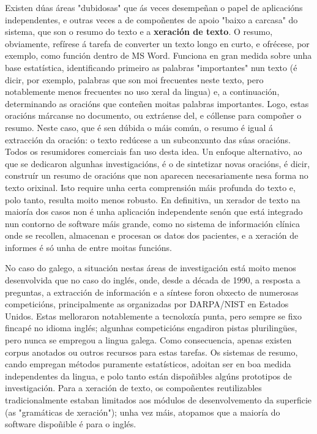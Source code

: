 \begin{multicols}{2}

Existen dúas áreas "dubidosas" que ás veces desempeñan o papel de aplicacións independentes, e outras veces a de compoñentes de apoio "baixo a carcasa" do sistema, que son o resumo do texto e a \textbf{xeración de texto}. O resumo, obviamente, refírese á tarefa de converter un texto longo en curto, e ofrécese, por exemplo, como función dentro de MS Word. Funciona en gran medida sobre unha base estatística, identificando primeiro as palabras "importantes" nun texto (é dicir, por exemplo, palabras que son moi frecuentes neste texto, pero notablemente menos frecuentes no uso xeral da lingua) e, a continuación, determinando as oracións que conteñen moitas palabras importantes. Logo, estas oracións márcanse no documento, ou extráense del, e cóllense para compoñer o resumo. Neste caso, que é sen dúbida o máis común, o resumo é igual á extracción da oración: o texto redúcese a un subconxunto das súas oracións. Todos os resumidores comerciais fan uso desta idea. Un enfoque alternativo, ao que se dedicaron algunhas investigacións, é o de sintetizar novas oracións, é dicir, construír un resumo de oracións que non aparecen necesariamente nesa forma no texto orixinal. Isto require unha certa comprensión máis profunda do texto e, polo tanto, resulta moito menos robusto. En definitiva, un xerador de texto na maioría dos casos non é unha aplicación independente senón que está integrado nun contorno de software máis grande, como no sistema de información clínica onde se recollen, almacenan e procesan os datos dos pacientes, e a xeración de informes é só unha de entre moitas funcións.


No caso do galego, a situación nestas áreas de investigación está moito menos desenvolvida que no caso do inglés, onde, desde a década de 1990, a resposta a preguntas, a extracción de información e a síntese foron obxecto de numerosas competicións, principalmente as organizadas por DARPA/NIST en Estados Unidos. Estas melloraron notablemente a tecnoloxía punta, pero sempre se fixo fincapé no idioma inglés; algunhas competicións engadiron pistas plurilingües, pero nunca se empregou a lingua galega. Como consecuencia, apenas existen corpus anotados ou outros recursos para estas tarefas. Os sistemas de resumo, cando empregan métodos puramente estatísticos, adoitan ser en boa medida independentes da lingua, e polo tanto están dispoñibles algúns prototipos de investigación. Para a xeración de texto, os compoñentes reutilizables tradicionalmente estaban limitados aos módulos de desenvolvemento da superficie (as "gramáticas de xeración"); unha vez máis, atopamos que a maioría do software dispoñible é para o inglés. 


\end{multicols}
